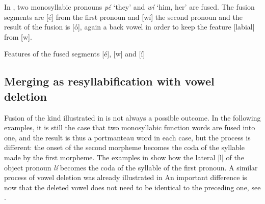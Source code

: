 \documentclass[output=paper]{langscibook}
\begin{document}
In , two monosyllabic pronouns \textit{pé} ‘they’ and \textit{wí} ‘him, her’ are fused. The fusion segments are [é] from the first pronoun and [wí] the second pronoun and the result of the fusion is [ó], again a back vowel in order to keep the feature [labial] from [w].  

\begin{exe}
\ex Features of the fused segments [é], [w] and [í]\label{ex:traore:39}\\
\end{exe}
 

\subsection{Merging as resyllabification with vowel deletion}
\label{sec:traore:merging_as_resyll_with_vowel_deletion:4b}
Fusion of the kind illustrated in  is not always a possible outcome. In the following examples, it is still the case that two monosyllabic function words are fused into one, and the result is thus a portmanteau word in each case, but the process is different: the onset of the second morpheme becomes the coda of the syllable made by the first morpheme. The examples in  show how the lateral [l] of the object pronoun \textit{lí} becomes the coda of the syllable of the first pronoun. A similar process of vowel deletion was already illustrated in  An important difference is now that the deleted vowel does not need to be identical to the preceding one, see .
\end{document}
